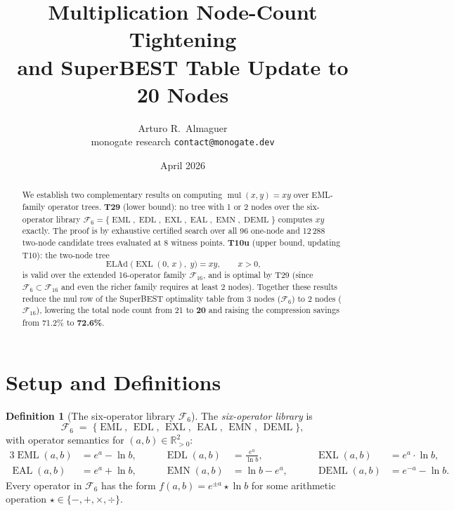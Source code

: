 \documentclass[12pt,a4paper]{article}
\title{Multiplication Node-Count Tightening\\
       and SuperBEST Table Update to 20 Nodes}
\author{Arturo R.\ Almaguer\\
\small monogate research \quad \texttt{contact@monogate.dev}}
\date{April 2026}
\theoremstyle{definition}
\newtheorem{definition}[theorem]{Definition}
\newcommand{\EML}{\operatorname{EML}}
\newcommand{\EDL}{\operatorname{EDL}}
\newcommand{\EXL}{\operatorname{EXL}}
\newcommand{\EAL}{\operatorname{EAL}}
\newcommand{\EMN}{\operatorname{EMN}}
\newcommand{\DEML}{\operatorname{DEML}}
\newcommand{\ELAd}{\operatorname{ELAd}}
\newcommand{\mul}{\operatorname{mul}}
\begin{document}
\maketitle

\begin{abstract}
We establish two complementary results on computing $\mul(x,y)=xy$ over
EML-family operator trees.
\textbf{T29} (lower bound): no tree with 1 or 2 nodes over the six-operator
library $\mathcal{F}_6 = \{\EML,\EDL,\EXL,\EAL,\EMN,\DEML\}$ computes $xy$
exactly.  The proof is by exhaustive certified search over all 96 one-node and
12\,288 two-node candidate trees evaluated at 8 witness points.
\textbf{T10u} (upper bound, updating T10): the two-node tree
\[
  \ELAd\!\bigl(\EXL(0,\,x),\;y\bigr) = xy, \qquad x > 0,
\]
is valid over the extended 16-operator family $\mathcal{F}_{16}$, and is
optimal by T29 (since $\mathcal{F}_6\subset\mathcal{F}_{16}$ and even the
richer family requires at least 2 nodes).
Together these results reduce the mul row of the SuperBEST optimality
table from 3 nodes ($\mathcal{F}_6$) to 2 nodes ($\mathcal{F}_{16}$),
lowering the total node count from 21 to \textbf{20} and raising the
compression savings from 71.2\% to \textbf{72.6\%}.
\end{abstract}

\tableofcontents
\bigskip

\section{Setup and Definitions}

\begin{definition}[The six-operator library $\mathcal{F}_6$]\label{def:F6}
The \emph{six-operator library} is
\[
  \mathcal{F}_6 \;=\; \{\EML,\,\EDL,\,\EXL,\,\EAL,\,\EMN,\,\DEML\},
\]
with operator semantics for $(a,b)\in\mathbb{R}_{>0}^2$:
\begin{alignat*}{3}
  \EML(a,b) &= e^{a} - \ln b,   \qquad &
  \EDL(a,b) &= \frac{e^{a}}{\ln b}, \qquad &
  \EXL(a,b) &= e^{a}\cdot\ln b, \\[4pt]
  \EAL(a,b) &= e^{a} + \ln b,   \qquad &
  \EMN(a,b) &= \ln b - e^{a},   \qquad &
  \DEML(a,b)&= e^{-a} - \ln b.
\end{alignat*}
Every operator in $\mathcal{F}_6$ has the form
$f(a,b) = e^{\pm a} \star \ln b$
for some arithmetic operation $\star\in\{-,+,\times,\div\}$.
\end{definition}
\end{document}
